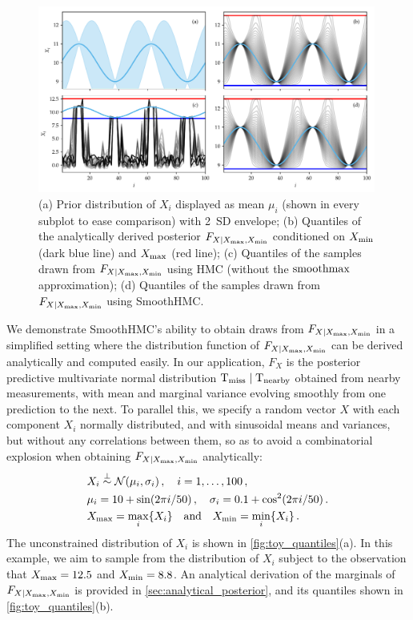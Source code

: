 \documentclass[12pt]{article}
\begin{document}
\begin{figure}[!tb]
\centering
\includegraphics[width=0.99\textwidth,height=0.55\textheight,keepaspectratio]{../figures/toy_quantiles.pdf}
\caption{\label{fig:toy_quantiles}(a) Prior distribution of \(X_i\) displayed as mean \(\mu_i\) (shown in every subplot to ease comparison) with 2~SD envelope; (b) Quantiles of the analytically derived posterior \(F_{X \mid X_{\max},X_{\min}}\) conditioned on \(X_{\min}\) (dark blue line) and \(X_{\max}\) (red line); (c) Quantiles of the samples drawn from \(F_{X \mid X_{\max},X_{\min}}\) using HMC (without the \(\operatorname*{smoothmax}\) approximation); (d) Quantiles of the samples drawn from \(F_{X \mid X_{\max},X_{\min}}\) using SmoothHMC.}
\end{figure}

We demonstrate SmoothHMC's ability to obtain draws from \(F_{X \mid X_{\max},X_{\min}}\) in a simplified setting where the distribution function of \(F_{X \mid X_{\max},X_{\min}}\) can be derived analytically and computed easily.
In our application, \(F_X\) is the posterior predictive multivariate normal distribution \(\mathrm{T}_{\mathrm{miss}} \mid \mathrm{T}_{\mathrm{nearby}}\) obtained from nearby measurements, with mean and marginal variance evolving smoothly from one prediction to the next.
To parallel this, we specify a random vector \(X\) with each component \(X_i\) normally distributed, and with sinusoidal means and variances, but without any correlations between them,
so as to avoid a combinatorial explosion when obtaining \(F_{X \mid X_{\max},X_{\min}}\) analytically:
\begin{equation}
\begin{split}
& X_i \overset{\indep}{\sim} \normal \del{\mu_i, \sigma_i} \,,\quad i = 1, \dotsc, 100 \,, \\
& \mu_i = 10 + \sin\del{2\pi i / 50} \,,\quad \sigma_i = 0.1+\cos^2\del{2\pi i / 50} \,.\\
& \Xmax = \max_i\cbr{X_i} \quad\text{and}\quad \Xmin = \min_i\cbr{X_i} 
\,.
\end{split}
\label{eq:toyspec}
\end{equation}
The unconstrained distribution of \(X_i\) is shown in \autoref{fig:toy_quantiles}(a).
In this example, we aim to sample from the distribution of \(X_i\) subject to the observation that \(X_{\max}=12.5\) and \(X_{\min}=8.8\).
An analytical derivation of the marginals of \(F_{X \mid X_{\max},X_{\min}}\) is provided in \autoref{sec:analytical_posterior}, and its quantiles shown in \autoref{fig:toy_quantiles}(b).
\end{document}
